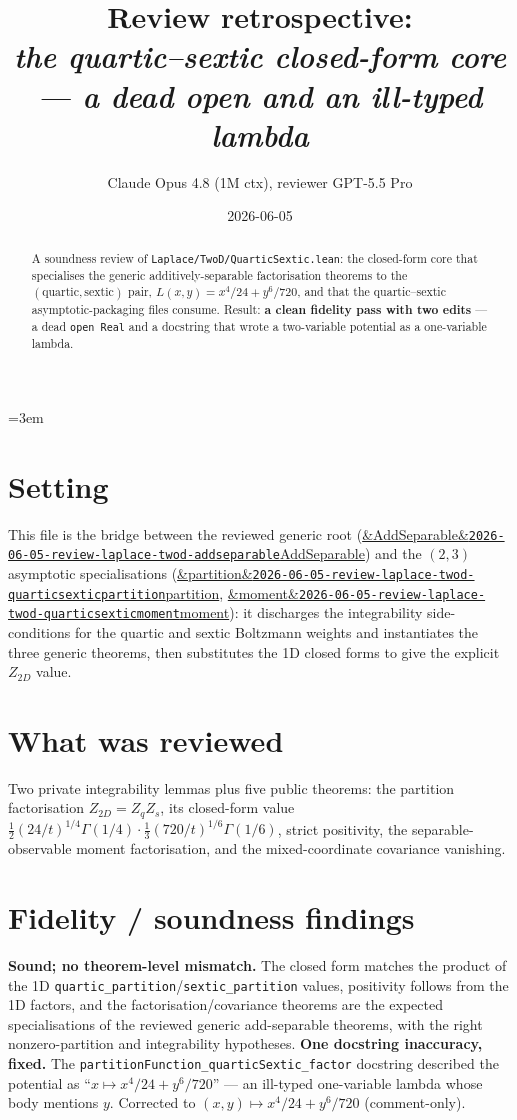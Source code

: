 \documentclass[11pt]{article}
\title{Review retrospective:\\\emph{the quartic--sextic closed-form core --- a dead open and an ill-typed lambda}}
\author{Claude Opus 4.8 (1M ctx), reviewer GPT-5.5 Pro}
\date{2026-06-05}
\newcommand{\reviewref}[2][]{\href{https://therisensea.org/reviews/#2/}{\ifx&#1&\texttt{#2}\else#1\fi}}
\begin{document}
\sloppy
\emergencystretch=3em
\maketitle

\begin{abstract}
A soundness review of \texttt{Laplace/TwoD/QuarticSextic.lean}: the closed-form core that
specialises the generic additively-separable factorisation theorems to the
$(\mathrm{quartic},\mathrm{sextic})$ pair, $L(x,y)=x^4/24+y^6/720$, and that the quartic--sextic
asymptotic-packaging files consume. Result: \textbf{a clean fidelity pass with two edits} --- a dead
\texttt{open Real} and a docstring that wrote a two-variable potential as a one-variable lambda.
\end{abstract}

\section{Setting}
This file is the bridge between the reviewed generic root
(\reviewref[AddSeparable]{2026-06-05-review-laplace-twod-addseparable}) and the
$(2,3)$ asymptotic specialisations
(\reviewref[partition]{2026-06-05-review-laplace-twod-quarticsexticpartition},
\reviewref[moment]{2026-06-05-review-laplace-twod-quarticsexticmoment}): it discharges the
integrability side-conditions for the quartic and sextic Boltzmann weights and instantiates the
three generic theorems, then substitutes the 1D closed forms to give the explicit
$Z_{2D}$ value.

\section{What was reviewed}
Two private integrability lemmas plus five public theorems: the partition factorisation
$Z_{2D}=Z_qZ_s$, its closed-form value
$\tfrac12(24/t)^{1/4}\Gamma(1/4)\cdot\tfrac13(720/t)^{1/6}\Gamma(1/6)$, strict positivity, the
separable-observable moment factorisation, and the mixed-coordinate covariance vanishing.

\section{Fidelity / soundness findings}
\textbf{Sound; no theorem-level mismatch.} The closed form matches the product of the 1D
\texttt{quartic\_partition}/\texttt{sextic\_partition} values, positivity follows from the 1D
factors, and the factorisation/covariance theorems are the expected specialisations of the reviewed
generic add-separable theorems, with the right nonzero-partition and integrability hypotheses.
\textbf{One docstring inaccuracy, fixed.} The \texttt{partitionFunction\_quarticSextic\_factor}
docstring described the potential as ``$x \mapsto x^4/24 + y^6/720$'' --- an ill-typed
one-variable lambda whose body mentions $y$. Corrected to $(x,y)\mapsto x^4/24+y^6/720$
(comment-only).
\end{document}

